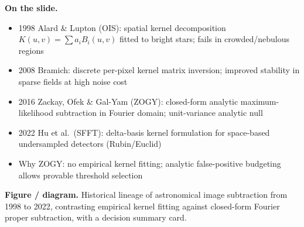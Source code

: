 \documentclass[11pt,a4paper]{article}
\begin{document}
\textbf{On the slide.}
\begin{itemize}[leftmargin=1.4em,itemsep=1.5pt,topsep=1.5pt]
\item 1998 Alard \& Lupton (OIS): spatial kernel decomposition $K(u,v)=\sum a_i B_i(u,v)$ fitted to bright stars; fails in crowded/nebulous regions
\item 2008 Bramich: discrete per-pixel kernel matrix inversion; improved stability in sparse fields at high noise cost
\item 2016 Zackay, Ofek \& Gal-Yam (ZOGY): closed-form analytic maximum-likelihood subtraction in Fourier domain; unit-variance analytic null
\item 2022 Hu et al.\ (SFFT): delta-basis kernel formulation for space-based undersampled detectors (Rubin/Euclid)
\item Why ZOGY: no empirical kernel fitting; analytic false-positive budgeting allows provable threshold selection
\end{itemize}

\textbf{Figure / diagram.} Historical lineage of astronomical image subtraction from 1998 to 2022, contrasting empirical kernel fitting against closed-form Fourier proper subtraction, with a decision summary card.
\end{document}
